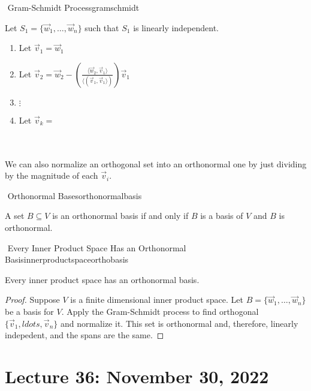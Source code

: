         \begin{theorem}{\Stop\,\,Gram-Schmidt Process}{gramschmidt}
            
            Let \(S_1=\{\vec{w}_1,\ldots,\vec{w}_n\}\) such that \(S_1\) is linearly independent.
            \begin{enumerate}
                \item Let \(\vec{v}_1=\vec{w}_1\)
                \item Let \(\vec{v}_2=\vec{w}_2-\left(\frac{\langle\vec{w}_2,\vec{v}_1\rangle}{\langle(\vec{v}_1,\vec{v}_1\rangle)}\right)\vec{v}_1\)
                \item \(\vdots\)
                \item Let \(\vec{v}_k=\)
            \end{enumerate}
            \DOTHISLATER

        \end{theorem}
        \vphantom
        \\
        \\
        We can also normalize an orthogonal set into an orthonormal one by just dividing by the magnitude of each \(\vec{v}_i\).
        \DOTHISLATER
        \begin{definition}{\Stop\,\,Orthonormal Bases}{orthonormalbasis}

            A set \(B\subseteq V\) is an orthonormal basis if and only if \(B\) is a basis of \(V\) and \(B\) is orthonormal.
            
        \end{definition}
        \begin{theorem}{\Stop\,\,Every Inner Product Space Has an Orthonormal Basis}{innerproductspaceorthobasis}

            Every inner product space has an orthonormal basis.
            \begin{proof}
                Suppose \(V\) is a finite dimensional inner product space. Let \(B=\{\vec{w}_1,\ldots,\vec{w}_n\}\) be a basis for \(V\). Apply the Gram-Schmidt process to find orthogonal \(\{\vec{v}_1,ldots,\vec{v}_n\}\) and normalize it. This set is orthonormal and, therefore, linearly indepedent, and the spans are the same.
                \DOTHISLATER
            \end{proof}
            
        \end{theorem}

        \pagebreak

\section{Lecture 36: November 30, 2022}

